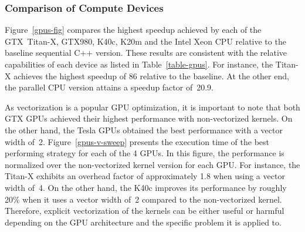 \subsubsection{Comparison of Compute Devices}
Figure~\ref{gpus-fig} compares the highest speedup achieved by each of the
GTX~\mbox{Titan-X}, GTX980, K40c, K20m and the Intel Xeon CPU relative to the baseline
sequential C++ version. These results are consistent with the relative
capabilities of each device as listed in Table~\ref{table-gpus}. For instance,
the \mbox{Titan-X} achieves the highest speedup of 86 relative to the baseline. At the
other end, the parallel CPU version attains a speedup factor of~20.9.

As vectorization is a popular GPU optimization, it is important to note that
both GTX GPUs achieved their highest performance with non-vectorized kernels.
On the other hand, the Tesla GPUs obtained the best performance with a vector
width of~2. Figure~\ref{gpus-v-sweep} presents the execution time of the best
performing strategy for each of the 4 GPUs. In this figure, the performance is
normalized over the non-vectorized kernel version for each GPU. For instance,
the \mbox{Titan-X} exhibits an overhead factor of approximately 1.8 when using a vector
width of~4. On the other hand, the K40c improves its performance by roughly
20\% when it uses a vector width of~2 compared to the non-vectorized kernel.
Therefore, explicit vectorization of the kernels can be either useful or
harmful depending on the GPU architecture and the specific problem it is
applied to.



